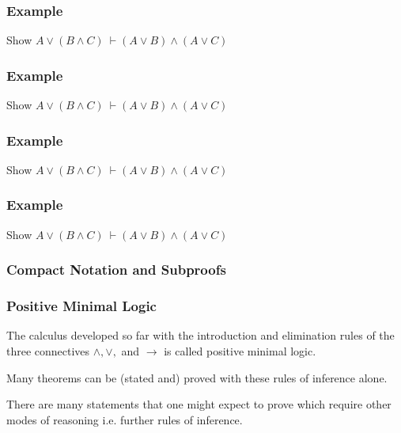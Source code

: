 \documentclass{beamer}
\begin{document}
\begin{frame}
  \frametitle{Example}

	Show $A \lor (B \land C) \ \vdash (A \lor B) \land (A \lor C)$
	
	\vspace{70mm}
\end{frame}

\begin{frame}
  \frametitle{Example}

	Show $A \lor (B \land C) \ \vdash (A \lor B) \land (A \lor C)$
	
	\vspace{70mm}
\end{frame}

\begin{frame}
  \frametitle{Example}

	Show $A \lor (B \land C) \ \vdash (A \lor B) \land (A \lor C)$
	
	\vspace{70mm}
\end{frame}

\begin{frame}
  \frametitle{Example}

	Show $A \lor (B \land C) \ \vdash (A \lor B) \land (A \lor C)$
	
	\vspace{70mm}
\end{frame}

\begin{frame}
	\frametitle{Compact Notation and Subproofs}

\end{frame}



\begin{frame}
  \frametitle{Positive Minimal Logic}

    The calculus developed so far with the introduction and elimination rules of the three connectives $\land, \lor,$ and $\to$ is called positive minimal logic. 

    \vspace{5mm}

    Many theorems can be (stated and) proved with these rules of inference alone. 

    \vspace{5mm}

    There are many statements that one might expect to prove which require other modes of reasoning i.e. further rules of inference.  

\end{frame}
\end{document}
